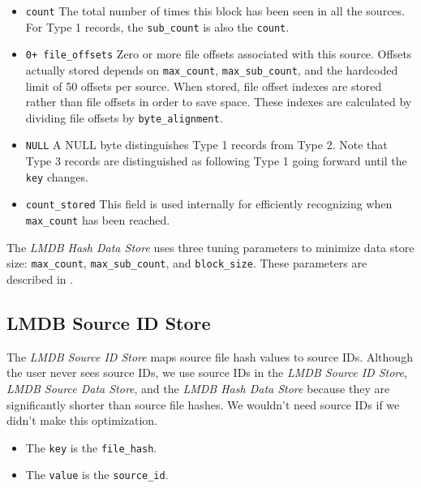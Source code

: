 \documentclass[11pt,fleqn]{article} %
\begin{document}
\begin{itemize}
\begin{itemize}
  \item \verb+count+ The total number of times this block has been seen in all the sources. For Type 1 records, the \verb+sub_count+ is also the \verb+count+.
  \item \verb-0+ file_offsets- Zero or more file offsets associated with this source. Offsets actually stored depends on \verb+max_count+, \verb+max_sub_count+, and the hardcoded limit of 50 offsets per source. When stored, file offset indexes are stored rather than file offsets in order to save space. These indexes are calculated by dividing file offsets by \verb+byte_alignment+.
  \item \verb+NULL+ A NULL byte distinguishes Type 1 records from Type 2. Note that Type 3 records are distinguished as following Type 1 going forward until the \verb+key+ changes.
  \item \verb+count_stored+ This field is used internally for efficiently recognizing when \verb+max_count+ has been reached.
  \end{itemize}
\end{itemize}

The \textit{LMDB Hash Data Store} uses three tuning parameters to minimize data store size: \verb+max_count+, \verb+max_sub_count+, and \verb+block_size+.  These parameters are described in \textbf{}.\\

\subsection{LMDB Source ID Store}
The \textit{LMDB Source ID Store} maps source file hash values to source IDs.  Although the user never sees source IDs, we use source IDs in the \textit{LMDB Source ID Store}, \textit{LMDB Source Data Store}, and the \textit{LMDB Hash Data Store} because they are significantly shorter than source file hashes.  We wouldn't need source IDs if we didn't make this optimization.

\begin{itemize}
\item The \verb+key+ is the \verb+file_hash+.
\item The \verb+value+ is the \verb+source_id+.
\end{itemize}
\end{document}
